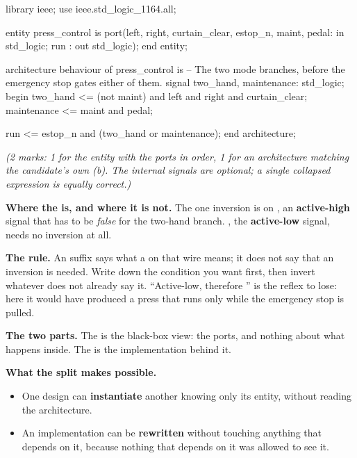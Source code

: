 \begin{vhdlcode}
library ieee;
use ieee.std_logic_1164.all;

entity press_control is
    port(left, right, curtain_clear, estop_n, maint, pedal: in  std_logic;
         run                                              : out std_logic);
end entity;

architecture behaviour of press_control is
-- The two mode branches, before the emergency stop gates either of them.
signal two_hand, maintenance: std_logic;
begin
    two_hand    <= (not maint) and left and right and curtain_clear;
    maintenance <= maint and pedal;

    run <= estop_n and (two_hand or maintenance);
end architecture;
\end{vhdlcode}

{\itshape (2 marks: 1 for the entity with the ports in order, 1 for an architecture matching the
candidate's own (b). The internal signals are optional; a single collapsed expression is equally
correct.)\par}

\medskip
\textbf{Where the  is, and where it is not.} The one inversion is on , an
\textbf{active-high} signal that has to be \emph{false} for the two-hand branch. , the
\textbf{active-low} signal, needs no inversion at all.

\textbf{The rule.} An  suffix says what a  on that wire means; it does not say that
an inversion is needed. Write down the condition you want first, then invert whatever does not
already say it. ``Active-low, therefore '' is the reflex to lose: here it would have
produced a press that runs only while the emergency stop is pulled. 

\textbf{The two parts.} The  is the black-box view: the ports, and nothing about what
happens inside. The  is the implementation behind it. 

\textbf{What the split makes possible.}
\begin{itemize}
  \item One design can \textbf{instantiate} another knowing only its entity, without reading the
    architecture.
  \item An implementation can be \textbf{rewritten} without touching anything that depends on it,
    because nothing that depends on it was allowed to see it.
\end{itemize}
\noindent{}

